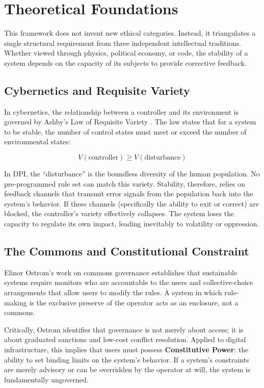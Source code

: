 \section{Theoretical Foundations}
\label{sec:theory}

This framework does not invent new ethical categories. Instead, it triangulates a single structural requirement from three independent intellectual traditions. Whether viewed through physics, political economy, or code, the stability of a system depends on the capacity of its subjects to provide corrective feedback.

\subsection{Cybernetics and Requisite Variety}

In cybernetics, the relationship between a controller and its environment is governed by Ashby's Law of Requisite Variety \citep{ashby1956}. The law states that for a system to be stable, the number of control states must meet or exceed the number of environmental states:

\begin{equation}
V(\text{controller}) \geq V(\text{disturbance})
\label{eq:ashby}
\end{equation}

In DPI, the ``disturbance'' is the boundless diversity of the human population. No pre-programmed rule set can match this variety. Stability, therefore, relies on feedback channels that transmit error signals from the population back into the system's behavior. If these channels (specifically the ability to exit or correct) are blocked, the controller's variety effectively collapses. The system loses the capacity to regulate its own impact, leading inevitably to volatility or oppression.

\subsection{The Commons and Constitutional Constraint}

Elinor Ostrom's work on commons governance \citep{ostrom1990} establishes that sustainable systems require monitors who are accountable to the users and collective-choice arrangements that allow users to modify the rules. A system in which rule-making is the exclusive preserve of the operator acts as an enclosure, not a commons.

Critically, Ostrom identifies that governance is not merely about access; it is about graduated sanctions and low-cost conflict resolution. Applied to digital infrastructure, this implies that users must possess \textbf{Constitutive Power}: the ability to set binding limits on the system's behavior. If a system's constraints are merely advisory or can be overridden by the operator at will, the system is fundamentally ungoverned.

